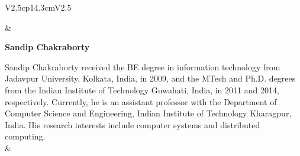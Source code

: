 \begin{tabular}{V{2.5}cp{14.3cm}V{2.5}}

 & 

\centerline{\large\bf Sandip Chakraborty}

\bigskip
Sandip Chakraborty received the BE degree in information technology from Jadavpur University, Kolkata, India, in 2009, and the MTech and Ph.D. degrees from the Indian Institute of Technology Guwahati, India, in 2011 and 2014, respectively. Currently, he is an assistant professor with the Department of Computer Science and Engineering, Indian Institute of Technology Kharagpur, India. His research interests include computer systems and distributed computing.\\
&\\
\end{tabular}




